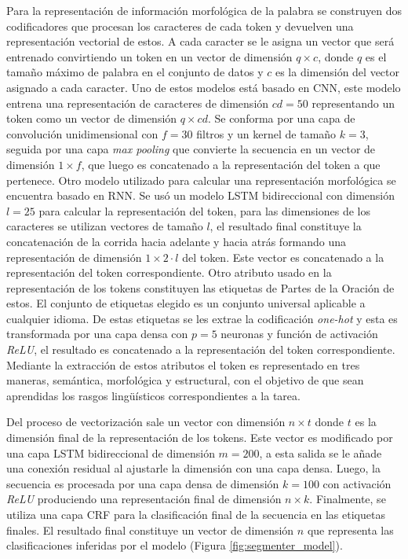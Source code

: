 \documentclass[a4paper,11pt,twocolumn,twoside]{article}
\begin{document}
Para la representación de información morfológica de la palabra se construyen dos
codificadores que procesan los caracteres de cada token y devuelven una representación vectorial de estos.
A cada caracter se le asigna un vector que será entrenado convirtiendo un token en un vector de dimensión
$q \times c$, donde $q$ es el tamaño máximo de palabra en el conjunto de datos y $c$ es la dimensión del vector
asignado a cada caracter.
Uno de estos modelos está basado en CNN, este modelo entrena una representación de caracteres de dimensión
$cd=50$ representando un token como un vector de dimensión $q \times cd$. Se conforma por una capa de convolución unidimensional
con $f=30$ filtros y un kernel de tamaño $k=3$, seguida por una capa \textit{max pooling} que convierte la secuencia en un vector
de dimensión $1 \times f$, que luego es concatenado a la representación del token a que pertenece.
Otro modelo utilizado para calcular una representación morfológica se encuentra basado en RNN. Se usó
un modelo LSTM bidireccional con dimensión $l=25$ para calcular la representación del token, para las dimensiones de los caracteres se
utilizan vectores de tamaño $l$, el resultado final constituye la concatenación de la corrida hacia adelante y
hacia atrás formando una representación de dimensión $1 \times 2 \cdot l$ del token. Este vector es concatenado a la representación
del token correspondiente. Otro atributo usado en la representación de los tokens constituyen las etiquetas de 
Partes de la Oración de estos.
El conjunto de etiquetas elegido es un conjunto universal \cite{petrov2011universal} aplicable a cualquier idioma.
De estas etiquetas se les extrae la codificación \textit{one-hot} y esta es transformada por una capa densa con $p=5$ neuronas
y función de activación \textit{ReLU}, el resultado es concatenado a la representación del token correspondiente. Mediante 
la extracción de estos atributos el token es representado en tres maneras, semántica, morfológica y estructural, con el 
objetivo de que sean aprendidas los rasgos lingüísticos correspondientes a la tarea.

Del proceso de vectorización sale un vector con dimensión $n \times t$ donde $t$ es la dimensión final de la representación
de los tokens. Este vector es modificado por una capa LSTM bidireccional de dimensión $m=200$, a esta salida se le 
añade una conexión residual al ajustarle la dimensión con una capa densa. Luego, la secuencia es procesada por una 
capa densa de dimensión $k=100$ con activación \textit{ReLU} produciendo una representación final de dimensión 
$n \times k$. Finalmente, se utiliza una capa CRF
para la clasificación final de la secuencia en las etiquetas finales. El resultado final constituye un vector
de dimensión $n$ que representa las clasificaciones inferidas por el modelo (Figura \ref{fig:segmenter_model}).
\end{document}

